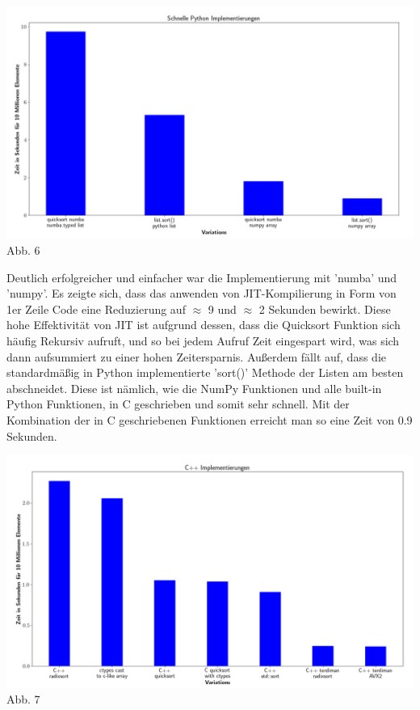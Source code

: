 \documentclass[12pt,a4paper]{article}
\begin{document}
\begin{center}
    \hspace*{-1.5cm}\includegraphics[width=1.2\textwidth]{./diagramme/matplotlib/pythonschnell.png}
    Abb. 6
\end{center}

Deutlich erfolgreicher und einfacher war die Implementierung mit 'numba' und 'numpy'.
Es zeigte sich, dass das anwenden von JIT-Kompilierung in Form von 1er Zeile Code
eine Reduzierung auf $\approx$ 9 und $\approx$ 2 Sekunden bewirkt. Diese hohe Effektivität von JIT
ist aufgrund dessen, dass die Quicksort Funktion sich häufig Rekursiv aufruft, und so bei jedem Aufruf
Zeit eingespart wird, was sich dann aufsummiert zu einer hohen Zeitersparnis.
Außerdem fällt auf, dass die standardmäßig in Python implementierte 'sort()' Methode der Listen
am besten abschneidet. Diese ist nämlich, wie die NumPy Funktionen und alle built-in Python Funktionen, in C geschrieben und
somit sehr schnell. Mit der Kombination der in C geschriebenen Funktionen erreicht man so eine Zeit von 0.9 Sekunden.

\begin{center}
    \hspace*{-1.5cm}\includegraphics[width=1.2\textwidth]{./diagramme/matplotlib/cpp.png}
    Abb. 7
\end{center}
\end{document}
